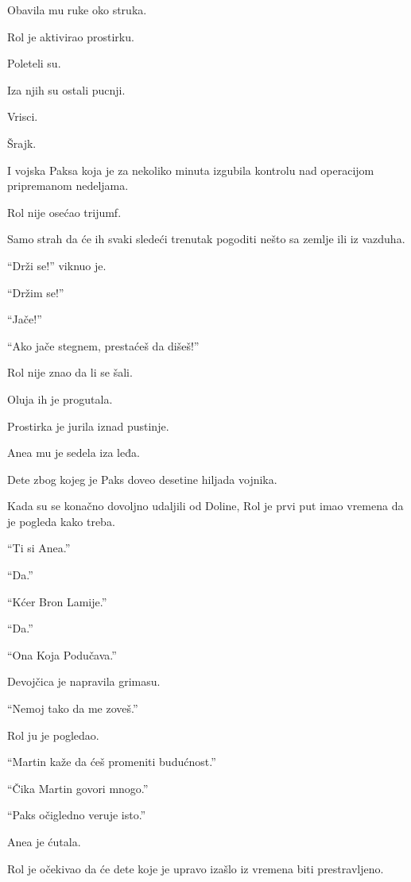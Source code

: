 Obavila mu ruke oko struka.

Rol je aktivirao prostirku.

\bigskip

Poleteli su.

Iza njih su ostali pucnji.

Vrisci.

Šrajk.

I vojska Paksa koja je za nekoliko minuta izgubila kontrolu nad operacijom pripremanom nedeljama.

\bigskip

Rol nije osećao trijumf.

Samo strah da će ih svaki sledeći trenutak pogoditi nešto sa zemlje ili iz vazduha.

``Drži se!'' viknuo je.

``Držim se!''

``Jače!''

``Ako jače stegnem, prestaćeš da dišeš!''

Rol nije znao da li se šali.

\bigskip

Oluja ih je progutala.

Prostirka je jurila iznad pustinje.

Anea mu je sedela iza leđa.

Dete zbog kojeg je Paks doveo desetine hiljada vojnika.

\bigskip

Kada su se konačno dovoljno udaljili od Doline, Rol je prvi put imao vremena da je pogleda kako treba.

``Ti si Anea.''

``Da.''

``Kćer Bron Lamije.''

``Da.''

``Ona Koja Podučava.''

Devojčica je napravila grimasu.

``Nemoj tako da me zoveš.''

Rol ju je pogledao.

``Martin kaže da ćeš promeniti budućnost.''

``Čika Martin govori mnogo.''

``Paks očigledno veruje isto.''

Anea je ćutala.

\bigskip

Rol je očekivao da će dete koje je upravo izašlo iz vremena biti prestravljeno.

